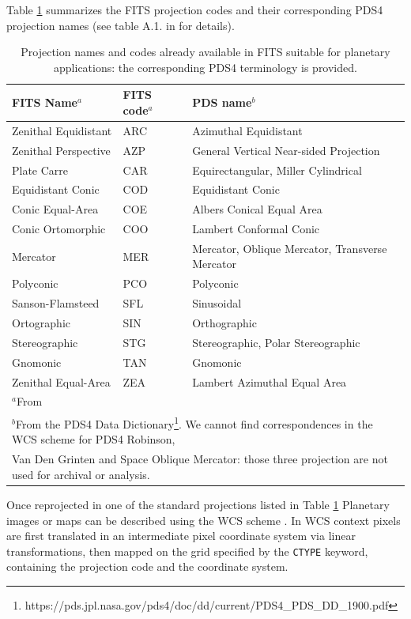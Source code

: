 Table \ref{table:proj} summarizes the FITS projection codes and their
corresponding PDS4 projection names (see table A.1. in \citet{calagreisenI}
for details).

\begin{table}
\caption{Projection names and codes already available in FITS suitable for
planetary applications: the corresponding PDS4 terminology is
provided.}
\centering
\begin{tabular}{l l l}
\hline
FITS Name$^{a}$ & FITS code$^{a}$ & PDS name$^{b}$ \\ 
\hline
Zenithal Equidistant & ARC & Azimuthal Equidistant \\
Zenithal Perspective & AZP & General Vertical Near-sided Projection \\
Plate Carre & CAR & Equirectangular, Miller Cylindrical \\
Equidistant Conic & COD & Equidistant Conic \\
Conic Equal-Area & COE & Albers Conical Equal Area \\ 
Conic Ortomorphic & COO & Lambert Conformal Conic\\
Mercator & MER & Mercator, Oblique Mercator, Transverse Mercator \\
Polyconic & PCO & Polyconic \\
Sanson-Flamsteed & SFL & Sinusoidal \\
Ortographic & SIN & Orthographic \\
Stereographic & STG & Stereographic, Polar Stereographic \\
Gnomonic & TAN & Gnomonic \\
Zenithal Equal-Area & ZEA & Lambert Azimuthal Equal Area \\
\hline
\multicolumn{3}{l}{$^{a}$From \citet{calagreisenI}} \\
\multicolumn{3}{l}{$^{b}$From the PDS4 Data Dictionary\footnote{https://pds.jpl.nasa.gov/pds4/doc/dd/current/PDS4\_PDS\_DD\_1900.pdf}. We cannot find correspondences in the WCS scheme for PDS4 Robinson,} \\
\multicolumn{3}{l}{Van Den Grinten and Space Oblique Mercator: those three projection are not used for archival or analysis.}
\end{tabular}
\label{table:proj}
\end{table}

Once reprojected in one of the standard projections listed in Table \ref{table:proj}
Planetary images or maps can be described using the WCS scheme
\citep{greisencalaII,calagreisenI}.
In WCS context pixels are first translated in an intermediate pixel coordinate system
via linear transformations, then mapped on the grid specified by the \texttt{CTYPE}
keyword, containing the projection code and the coordinate system.
% 
% 

